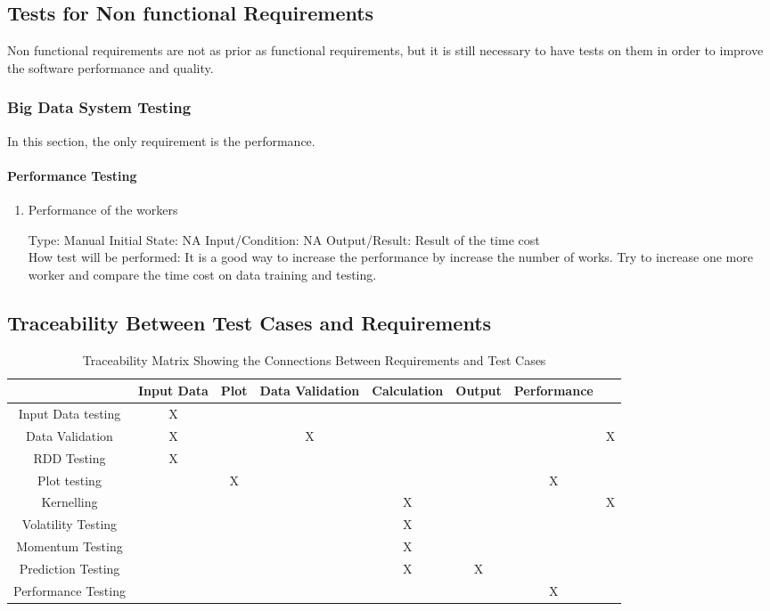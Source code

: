\documentclass[12pt, titlepage]{article}
\begin{document}
\subsection{Tests for Non functional Requirements}
Non functional requirements are not as prior as functional requirements, but it is still necessary to have tests on them in order to improve the software performance and quality.
\subsubsection{Big Data System Testing}
In this section, the only requirement is the performance.
\paragraph{ Performance Testing}

\begin{enumerate}

\item{Performance of the workers\\}

Type: Manual
Initial State: NA
Input/Condition: NA
Output/Result: Result of the time cost\\
How test will be performed: It is a good way to increase the performance by increase the number of works. Try to increase one more worker and compare the time cost on data training and testing.


\end{enumerate}

\newpage
\subsection{Traceability Between Test Cases and Requirements}

\begin{table}[h!]
\centering
\begin{tabular}{|c|c|c|c|c|c|c|c|}
\hline
& Input Data & Plot & Data Validation & Calculation & Output &Performance\\
\hline
Input Data testing &X & & & & & \\ \hline
Data Validation &X & &X & & & &X \\ \hline
RDD Testing &X & & & & & & \\ \hline
Plot testing & &X & & & &X \\ \hline
Kernelling & & & & X& & &X \\ \hline
Volatility Testing & & & &X & & & \\ \hline 
Momentum Testing & & & &X & & & \\ \hline 
Prediction Testing & & & &X &X & & \\ \hline 
Performance Testing & & & & & & X& \\ \hline 

\end{tabular}
\caption{Traceability Matrix Showing the Connections Between Requirements and Test Cases}
\label{Table:R_trace}
\end{table}
\end{document}

